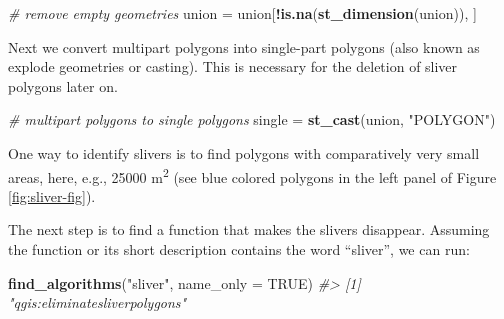 \documentclass[]{krantz}
\newenvironment{Shaded}{\begin{snugshade}}{\end{snugshade}}
\newcommand{\CommentTok}[1]{\textcolor[rgb]{0.37,0.37,0.37}{\textit{#1}}}
\newcommand{\DataTypeTok}[1]{\textcolor[rgb]{0.27,0.27,0.27}{#1}}
\newcommand{\DecValTok}[1]{\textcolor[rgb]{0.06,0.06,0.06}{#1}}
\newcommand{\KeywordTok}[1]{\textcolor[rgb]{0.27,0.27,0.27}{\textbf{#1}}}
\newcommand{\NormalTok}[1]{#1}
\newcommand{\OperatorTok}[1]{\textcolor[rgb]{0.43,0.43,0.43}{\textbf{#1}}}
\newcommand{\OtherTok}[1]{\textcolor[rgb]{0.37,0.37,0.37}{#1}}
\newcommand{\StringTok}[1]{\textcolor[rgb]{0.5,0.5,0.5}{#1}}
\begin{document}
\begin{Shaded}
\begin{Highlighting}[]
\CommentTok{# remove empty geometries}
\NormalTok{union =}\StringTok{ }\NormalTok{union[}\OperatorTok{!}\KeywordTok{is.na}\NormalTok{(}\KeywordTok{st_dimension}\NormalTok{(union)), ]}
\end{Highlighting}
\end{Shaded}

Next we convert multipart polygons into single-part polygons (also known as explode geometries or casting).
This is necessary for the deletion of sliver polygons later on.

\begin{Shaded}
\begin{Highlighting}[]
\CommentTok{# multipart polygons to single polygons}
\NormalTok{single =}\StringTok{ }\KeywordTok{st_cast}\NormalTok{(union, }\StringTok{"POLYGON"}\NormalTok{)}
\end{Highlighting}
\end{Shaded}

One way to identify slivers is to find polygons with comparatively very small areas, here, e.g., 25000 m\textsuperscript{2} (see blue colored polygons in the left panel of Figure \ref{fig:sliver-fig}).

\begin{Shaded}
\end{Shaded}

The next step is to find a function that makes the slivers disappear.
Assuming the function or its short description contains the word ``sliver'', we can run:

\begin{Shaded}
\begin{Highlighting}[]
\KeywordTok{find_algorithms}\NormalTok{(}\StringTok{"sliver"}\NormalTok{, }\DataTypeTok{name_only =} \OtherTok{TRUE}\NormalTok{)}
\CommentTok{#> [1] "qgis:eliminatesliverpolygons"}
\end{Highlighting}
\end{Shaded}
\end{document}
